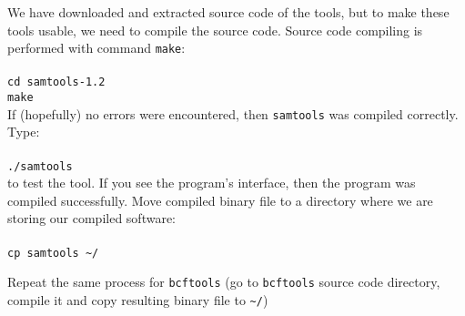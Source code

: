 We have downloaded and extracted source code of the tools, but to make
these tools usable, we need to compile the source code. Source code compiling
is performed with command \texttt{make}:\\~\\
\texttt{cd samtools-1.2}\\
\texttt{make}\\

If (hopefully) no errors were encountered, then \texttt{samtools} was compiled correctly. Type:\\~\\
\texttt{./samtools}\\

to test the tool. If you see the program's interface, then the program was compiled successfully.
Move compiled binary file to a directory where we are storing our compiled software:\\~\\
\texttt{cp samtools \textasciitilde/\binDir\\}

Repeat the same process for \texttt{bcftools}
(go to \texttt{bcftools} source code directory,
compile it and copy resulting binary file to \texttt{\textasciitilde/\binDir})
